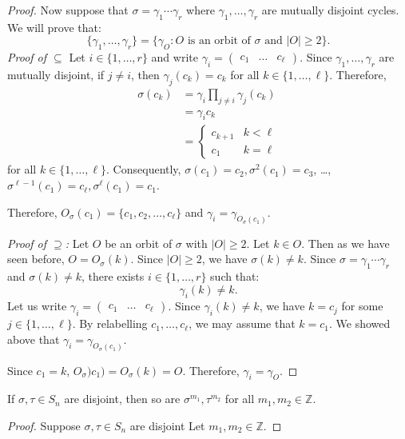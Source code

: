 \begin{itemize}
\begin{proof}
        Now suppose that $\sigma=\gamma_1\cdots \gamma_r$ where $\gamma_1,\dots,\gamma_r$ are mutually disjoint cycles. We will prove that:
        \begin{equation}
            \{\gamma_1,\dots,\gamma_r\} = \{\gamma_O: O\text{ is an orbit of } \sigma \text{ and } |O|\ge 2\}.
        \end{equation}
        \textit{Proof of $\subseteq$} Let $i \in \{1,\dots, r\}$ and write $\gamma_i = \begin{pmatrix}
            c_1&\dots & c_\ell
        \end{pmatrix}$. Since $\gamma_1,\dots,\gamma_r$ are mutually disjoint, if $j\neq i$, then $\gamma_j(c_k) = c_k$ for all $k \in \{1,\dots,\ell\}$. Therefore,
        \begin{align}
            \sigma(c_k) &= \gamma_i \prod_{j\neq i} \gamma_{j}(c_k) \\ 
            &=  \gamma_i c_k \\ 
            &= \begin{cases}
                c_{k+1} & k < \ell \\ 
                c_1 & k=\ell
            \end{cases}
        \end{align}
        for all $k \in \{1,\dots,\ell\}$. Consequently, $\sigma(c_1)=c_2, \sigma^2(c_1)=c_3$, \dots, $\sigma^{\ell-1}(c_1)=c_\ell, \sigma^\ell(c_1)=c_1$.

        Therefore, $O_\sigma(c_1)=\{c_1,c_2,\dots,c_\ell\}$ and $\gamma_i = \gamma_{O_\sigma(c_1)}$.

        \textit{Proof of $\supseteq$:} Let $O$ be an orbit of $\sigma$ with $|O|\ge 2$. Let $k \in O$. Then as we have seen before, $O=O_\sigma(k)$. Since $|O|\ge 2$, we have $\sigma(k)\neq k$. Since $\sigma = \gamma_1\cdots \gamma_r$ and $\sigma(k) \neq k$, there exists $i\in \{1,\dots,r\}$ such that:
        \begin{equation}
            \gamma_i(k) \neq k.
        \end{equation}
        Let us write $\gamma_i = \begin{pmatrix}
            c_1 & \dots & c_\ell
        \end{pmatrix}$. Since $\gamma_i(k) \neq k$, we have $k=c_j$ for some $j\in \{1,\dots,\ell\}$. By relabelling $c_1,\dots,c_\ell$, we may assume that $k=c_1$. We showed above that $\gamma_i=\gamma_{O_\sigma(c_1)}$.

        Since $c_1=k$, $O_{\sigma})c_1)=O_{\sigma}(k)=O$. Therefore, $\gamma_i=\gamma_O$.
    \end{proof}
    \begin{lemma}
        If $\sigma, \tau \in S_n$ are disjoint, then so are $\sigma^{m_1}, \tau^{m_2}$ for all $m_1,m_2 \in \mathbb{Z}$.
    \end{lemma}
    \begin{proof}
        Suppose $\sigma,\tau \in S_n$ are disjoint Let $m_1,m_2 \in \mathbb{Z}$.


\end{proof}
\end{itemize}
